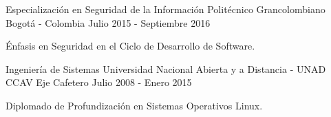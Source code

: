 

\begin{cventries}

  \cventry
    {Especialización en Seguridad de la Información} %
    {Politécnico Grancolombiano} %
    {Bogotá - Colombia} %
    {Julio 2015 - Septiembre 2016} %
    {
      \begin{cvitems} %
        \item {Énfasis en Seguridad en el Ciclo de Desarrollo de Software.}
      \end{cvitems}
    }
   \cventry
    {Ingeniería de Sistemas} %
    {Universidad Nacional Abierta y a Distancia - UNAD} %
    {CCAV Eje Cafetero} %
    {Julio 2008 - Enero 2015} %
    {
      \begin{cvitems} %
        \item {Diplomado de Profundización en Sistemas Operativos Linux.}
      \end{cvitems}
    }

\end{cventries}
